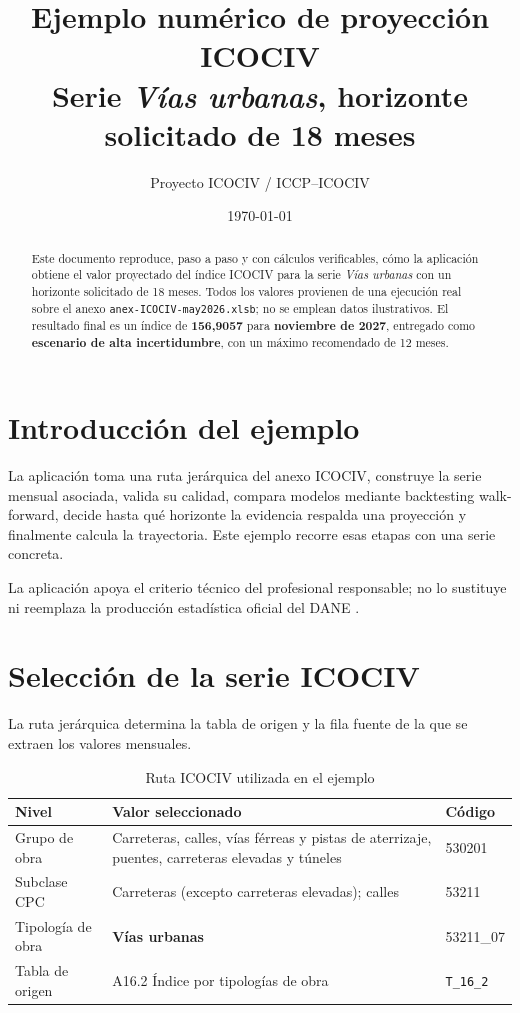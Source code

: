 \documentclass[11pt,letterpaper]{article}
\title{Ejemplo numérico de proyección ICOCIV\\
\large Serie \textit{Vías urbanas}, horizonte solicitado de 18 meses}
\author{Proyecto ICOCIV / ICCP--ICOCIV}
\date{\today}
\begin{document}
\maketitle

\begin{abstract}
\noindent
Este documento reproduce, paso a paso y con cálculos verificables, cómo la
aplicación obtiene el valor proyectado del índice ICOCIV para la serie
\textit{Vías urbanas} con un horizonte solicitado de 18 meses. Todos los
valores provienen de una ejecución real sobre el anexo
\texttt{anex-ICOCIV-may2026.xlsb}; no se emplean datos ilustrativos. El
resultado final es un índice de \textbf{156{,}9057} para
\textbf{noviembre de 2027}, entregado como \textbf{escenario de alta
incertidumbre}, con un máximo recomendado de 12 meses.
\end{abstract}

\tableofcontents
\newpage

\section{Introducción del ejemplo}

La aplicación toma una ruta jerárquica del anexo ICOCIV, construye la serie
mensual asociada, valida su calidad, compara modelos mediante backtesting
walk-forward, decide hasta qué horizonte la evidencia respalda una proyección y
finalmente calcula la trayectoria. Este ejemplo recorre esas etapas con una
serie concreta.

La aplicación apoya el criterio técnico del profesional responsable; no lo
sustituye ni reemplaza la producción estadística oficial del
DANE \cite{dane_metodologia_icociv}.

\section{Selección de la serie ICOCIV}

La ruta jerárquica determina la tabla de origen y la fila fuente de la que se
extraen los valores mensuales.

\begin{table}[H]
\centering
\caption{Ruta ICOCIV utilizada en el ejemplo}
\begin{tabular}{@{}p{4.2cm}p{8.6cm}p{2.2cm}@{}}
\toprule
\textbf{Nivel} & \textbf{Valor seleccionado} & \textbf{Código} \\
\midrule
Grupo de obra & Carreteras, calles, vías férreas y pistas de aterrizaje, puentes, carreteras elevadas y túneles & 530201 \\
Subclase CPC & Carreteras (excepto carreteras elevadas); calles & 53211 \\
Tipología de obra & \textbf{Vías urbanas} & 53211\_07 \\
Tabla de origen & A16.2 Índice por tipologías de obra & \texttt{T\_16\_2} \\
\bottomrule
\end{tabular}
\end{table}
\end{document}
